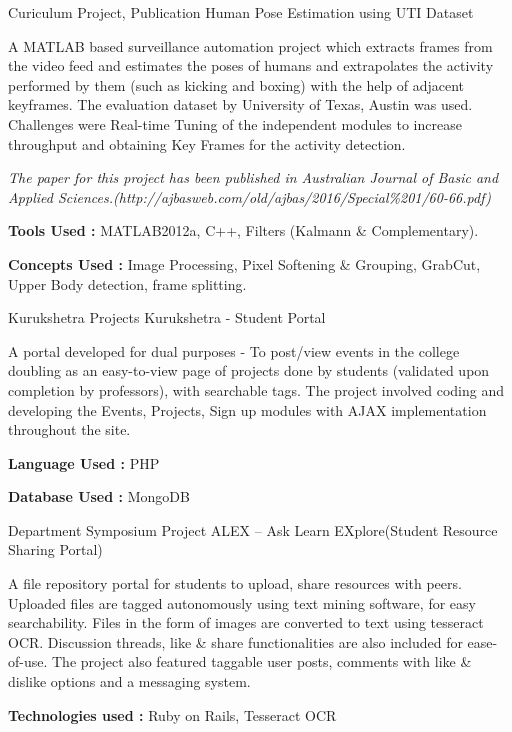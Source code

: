 \begin{cventries}
  \cventry
    {Curiculum Project, Publication} %
    {Human Pose Estimation using UTI Dataset} %
    {} %
    {} %
    {
      \begin{cvitems}
      \item{A MATLAB based surveillance automation project which extracts frames from the video feed and estimates the poses of humans and extrapolates the activity performed by them (such as kicking and boxing) with the help of   adjacent keyframes. The evaluation dataset by University of Texas, Austin was used. Challenges were Real-time   Tuning of the independent modules to increase throughput and obtaining Key Frames for the activity detection.}
      \item{\textit{The paper for this project has been published in Australian Journal of Basic and Applied Sciences.(http://ajbasweb.com/old/ajbas/2016/Special\%201/60-66.pdf)}}
      \item{\textbf{Tools Used :} MATLAB2012a, C++, Filters (Kalmann \& Complementary).}
      \item{\textbf{Concepts Used :} Image Processing, Pixel Softening \& Grouping, GrabCut, Upper Body detection, frame splitting.}
      \end{cvitems}
    }

  \cventry
    {Kurukshetra Projects} %
    {Kurukshetra - Student Portal} %
    {} %
    {} %
    {
      \begin{cvitems}
      \item{A portal developed for dual purposes - To post/view events in the college doubling as an easy-to-view page of projects done by students (validated upon completion by professors), with searchable tags. The project involved coding and developing the Events, Projects, Sign up modules with AJAX implementation throughout the site.}
      \item{\textbf{Language Used :} PHP}
      \item{\textbf{Database Used :} MongoDB}
      \end{cvitems}
    }

  \cventry
    {Department Symposium Project} %
    {ALEX – Ask Learn EXplore(Student Resource Sharing Portal)} %
    {} %
    {} %
    {
      \begin{cvitems}
      \item{A file repository portal for students to upload, share resources with peers. Uploaded files are tagged autonomously using text mining software, for easy searchability. Files in the form of images are converted to text using tesseract OCR. Discussion threads, like \& share functionalities are also included for ease-of-use. The project also featured taggable user posts, comments with like \& dislike options and a messaging system. }
      \item{\textbf{Technologies used :} Ruby on Rails, Tesseract OCR}
      \end{cvitems}
    }
\end{cventries}
